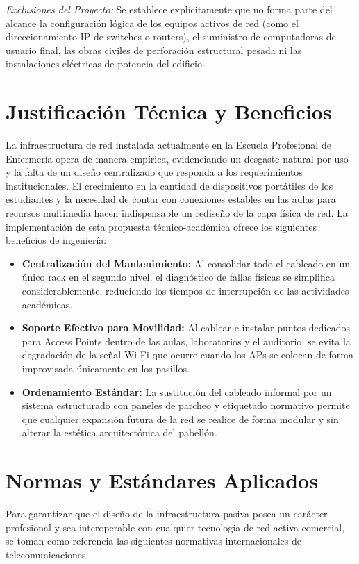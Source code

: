 \textit{Exclusiones del Proyecto:} Se establece explícitamente que no forma parte del alcance la configuración lógica de los equipos activos de red (como el direccionamiento IP de switches o routers), el suministro de computadoras de usuario final, las obras civiles de perforación estructural pesada ni las instalaciones eléctricas de potencia del edificio.

\section{Justificación Técnica y Beneficios}
La infraestructura de red instalada actualmente en la Escuela Profesional de Enfermería opera de manera empírica, evidenciando un desgaste natural por uso y la falta de un diseño centralizado que responda a los requerimientos institucionales.
El crecimiento en la cantidad de dispositivos portátiles de los estudiantes y la necesidad de contar con conexiones estables en las aulas para recursos multimedia hacen indispensable un rediseño de la capa física de red.
La implementación de esta propuesta técnico-académica ofrece los siguientes beneficios de ingeniería:
\begin{itemize}[label=$\bullet$,leftmargin=1.4em]
    \item \textbf{Centralización del Mantenimiento:} Al consolidar todo el cableado en un único rack en el segundo nivel, el diagnóstico de fallas físicas se simplifica considerablemente, reduciendo los tiempos de interrupción de las actividades académicas.
    \item \textbf{Soporte Efectivo para Movilidad:} Al cablear e instalar puntos dedicados para Access Points dentro de las aulas, laboratorios y el auditorio, se evita la degradación de la señal Wi-Fi que ocurre cuando los APs se colocan de forma improvisada únicamente en los pasillos.
    \item \textbf{Ordenamiento Estándar:} La sustitución del cableado informal por un sistema estructurado con paneles de parcheo y etiquetado normativo permite que cualquier expansión futura de la red se realice de forma modular y sin alterar la estética arquitectónica del pabellón.
\end{itemize}

\section{Normas y Estándares Aplicados}
Para garantizar que el diseño de la infraestructura pasiva posea un carácter profesional y sea interoperable con cualquier tecnología de red activa comercial, se toman como referencia las siguientes normativas internacionales de telecomunicaciones:

